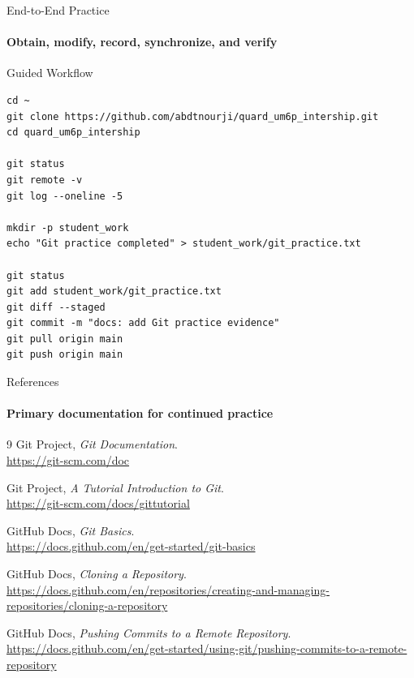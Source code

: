 \begin{frame}[fragile]{End-to-End Practice}
\framesubtitle{Obtain, modify, record, synchronize, and verify}
\scriptsize
\begin{exampleblock}{Guided Workflow}
\begin{verbatim}
cd ~
git clone https://github.com/abdtnourji/quard_um6p_intership.git
cd quard_um6p_intership

git status
git remote -v
git log --oneline -5

mkdir -p student_work
echo "Git practice completed" > student_work/git_practice.txt

git status
git add student_work/git_practice.txt
git diff --staged
git commit -m "docs: add Git practice evidence"
git pull origin main
git push origin main
\end{verbatim}
\end{exampleblock}

\end{frame}


\begin{frame}{References}
\framesubtitle{Primary documentation for continued practice}
\scriptsize
\begin{thebibliography}{9}
Git Project, \emph{Git Documentation}.\\
\url{https://git-scm.com/doc}

Git Project, \emph{A Tutorial Introduction to Git}.\\
\url{https://git-scm.com/docs/gittutorial}

GitHub Docs, \emph{Git Basics}.\\
\url{https://docs.github.com/en/get-started/git-basics}

GitHub Docs, \emph{Cloning a Repository}.\\
\url{https://docs.github.com/en/repositories/creating-and-managing-repositories/cloning-a-repository}

GitHub Docs, \emph{Pushing Commits to a Remote Repository}.\\
\url{https://docs.github.com/en/get-started/using-git/pushing-commits-to-a-remote-repository}
\end{thebibliography}
\end{frame}




